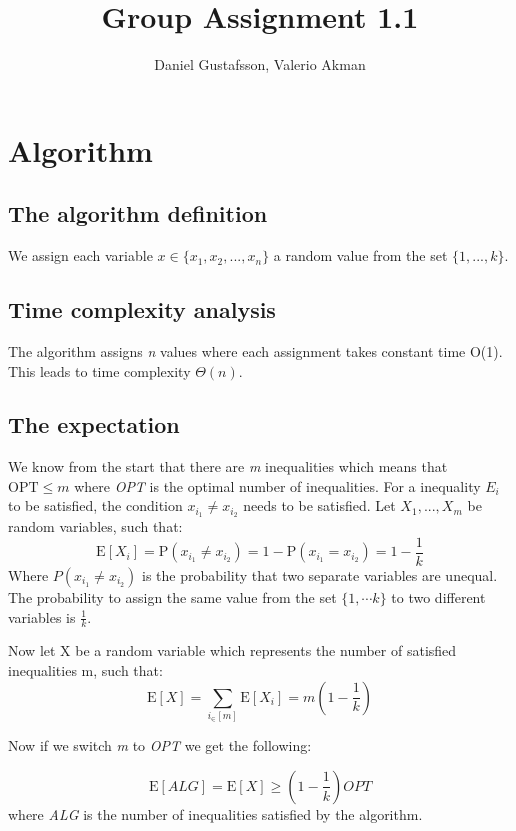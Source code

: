\documentclass[11pt,a4paper]{article}
\title{Group Assignment 1.1}
\author{Daniel Gustafsson, Valerio Akman}
\begin{document}
\maketitle

\section{Algorithm}
\subsection{The algorithm definition}
We assign each variable $x \in \{x_1, x_2, ... ,x_n\}$ a random value from the set $\{1,...,k\}$.

\subsection{Time complexity analysis}
The algorithm assigns \textit{n} values where each assignment takes constant time O(1). This leads to time complexity $\Theta (n)$.

\subsection{The expectation}
We know from the start that there are \textit{m} inequalities which means that $\text{OPT} \leq m$ where \textit{OPT} is the optimal number of inequalities.
For a inequality $E_i$ to be satisfied, the condition $x_{i_1} \ne x_{i_2}$ needs to be satisfied. Let $X_1,...,X_m$ be random variables, such that: 
\[\text{E}[X_i] = \text{P}(x_{i_1} \ne x_{i_2}) = 1 - \text{P}(x_{i_1} = x_{i_2}) = 1 - \frac{1}{k}\]
Where $P(x_{i_1} \ne x_{i_2})$ is the probability that two separate variables are unequal. The probability to assign the same value from the set $\{1, \cdots k\}$ to two different variables is $\frac{1}{k}$.

Now let X be a random variable which represents the number of satisfied inequalities m, such that:
\[\text{E}[X] = \sum_{i_\in [m]} \text{E}[X_i] = m(1 - \frac{1}{k}) \]

Now if we switch \textit{m} to \textit{OPT} we get the following:

\[\text{E}[ALG] = \text{E}[X] \geq (1 - \frac{1}{k})OPT\]
where \textit{ALG} is the number of inequalities satisfied by the algorithm.
\end{document}
